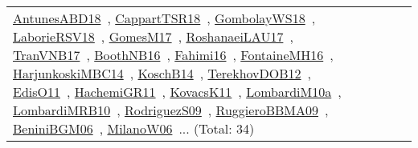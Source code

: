 {\begin{longtable}{lp{3cm}>{\raggedright\arraybackslash}p{6cm}>{\raggedright\arraybackslash}p{6cm}>{\raggedright\arraybackslash}p{8cm}}
\href{../works/AntunesABD18.pdf}{AntunesABD18}~\cite{AntunesABD18}, \href{../works/CappartTSR18.pdf}{CappartTSR18}~\cite{CappartTSR18}, \href{../works/GombolayWS18.pdf}{GombolayWS18}~\cite{GombolayWS18}, \href{../works/LaborieRSV18.pdf}{LaborieRSV18}~\cite{LaborieRSV18}, \href{../works/GomesM17.pdf}{GomesM17}~\cite{GomesM17}, \href{../works/RoshanaeiLAU17.pdf}{RoshanaeiLAU17}~\cite{RoshanaeiLAU17}, \href{../works/TranVNB17.pdf}{TranVNB17}~\cite{TranVNB17}, \href{../works/BoothNB16.pdf}{BoothNB16}~\cite{BoothNB16}, \href{../works/Fahimi16.pdf}{Fahimi16}~\cite{Fahimi16}, \href{../works/FontaineMH16.pdf}{FontaineMH16}~\cite{FontaineMH16}, \href{../works/HarjunkoskiMBC14.pdf}{HarjunkoskiMBC14}~\cite{HarjunkoskiMBC14}, \href{../works/KoschB14.pdf}{KoschB14}~\cite{KoschB14}, \href{../works/TerekhovDOB12.pdf}{TerekhovDOB12}~\cite{TerekhovDOB12}, \href{../works/EdisO11.pdf}{EdisO11}~\cite{EdisO11}, \href{../works/HachemiGR11.pdf}{HachemiGR11}~\cite{HachemiGR11}, \href{../works/KovacsK11.pdf}{KovacsK11}~\cite{KovacsK11}, \href{../works/LombardiM10a.pdf}{LombardiM10a}~\cite{LombardiM10a}, \href{../works/LombardiMRB10.pdf}{LombardiMRB10}~\cite{LombardiMRB10}, \href{../works/RodriguezS09.pdf}{RodriguezS09}~\cite{RodriguezS09}, \href{../works/RuggieroBBMA09.pdf}{RuggieroBBMA09}~\cite{RuggieroBBMA09}, \href{../works/BeniniBGM06.pdf}{BeniniBGM06}~\cite{BeniniBGM06}, \href{../works/MilanoW06.pdf}{MilanoW06}~\cite{MilanoW06}... (Total: 34)\\

\end{longtable}}
